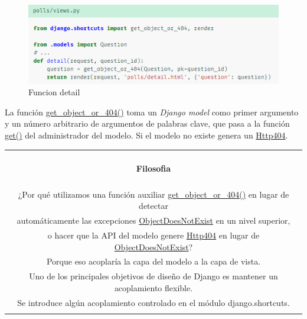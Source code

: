 \documentclass[10pt]{article}
\newcommand{\django}[1]{{\textcolor{G}{Django} #1}}
\begin{document}
\begin{figure}[H]
\begin{center}
\includegraphics[scale=1]{figuras/3/33/334/img3.png}
\caption{Funcion detail}
\end{center}
\end{figure}


La función {\href{https://docs.djangoproject.com/en/3.0/topics/http/shortcuts/\#django.shortcuts.get\_object\_or\_404}{\textcolor{B}{get\_object\_or\_404()}}} toma un \textit{\django{} model} como primer argumento 
y un número arbitrario de argumentos de palabras clave, que pasa a la función {\href{https://docs.djangoproject.com/en/3.0/ref/models/querysets/\#django.db.models.query.QuerySet.get}{\textcolor{B}{get()}}} del administrador del modelo.
Si el modelo no existe genera un {\href{https://docs.djangoproject.com/en/3.0/topics/http/views/\#django.http.Http404}{\textcolor{B}{Http404}}}.

\begin{table}[H]
	\begin{tabular}{||c||}
	\hline \\
	\begin{Large}
	\textbf{Filosofia}
	\end{Large}
	\\\\		
¿Por qué utilizamos una función auxiliar {\href{https://docs.djangoproject.com/en/3.0/topics/http/shortcuts/\#django.shortcuts.get\_object\_or\_404}{\textcolor{B}{get\_object\_or\_404()}}} en lugar de detectar\\ automáticamente las excepciones {\href{https://docs.djangoproject.com/en/3.0/ref/exceptions/\#django.core.exceptions.ObjectDoesNotExist}{\textcolor{B}{ObjectDoesNotExist}}} en un nivel superior,\\ o hacer que la API del modelo genere {\href{https://docs.djangoproject.com/en/3.0/topics/http/views/\#django.http.Http404}{\textcolor{B}{Http404}}} en lugar de {\href{https://docs.djangoproject.com/en/3.0/ref/exceptions/\#django.core.exceptions.ObjectDoesNotExist}{\textcolor{B}{ObjectDoesNotExist}}}?\\

Porque eso acoplaría la capa del modelo a la capa de vista.\\ Uno de los principales objetivos de diseño de \django{} es mantener un acoplamiento flexible.\\ Se introduce algún acoplamiento controlado en el módulo \textcolor{G}{django.shortcuts}.
\\\\ \hline 	
			\end{tabular}			
		\end{table}		
\end{document}
